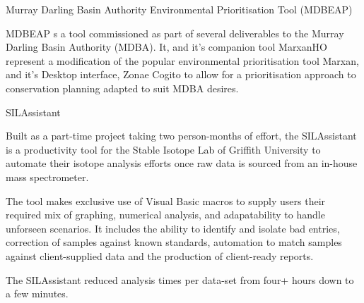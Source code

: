 \documentclass{portfolio}
\begin{document}
\begin{Projects}
\begin{Project}{Murray Darling Basin Authority Environmental Prioritisation Tool (MDBEAP)}
      \begin{ProjectOverview}
        MDBEAP s a tool commissioned as part of several deliverables to the Murray Darling Basin Authority (MDBA).  It, and it's companion tool MarxanHO
        represent a modification of the popular environmental prioritisation tool Marxan, and it's Desktop interface, Zonae Cogito to allow for a 
        prioritisation approach to conservation planning adapted to suit MDBA desires.  
      \end{ProjectOverview}
    \end{Project}
    \begin{Project}{SILAssistant}
      \begin{ProjectOverview}
         Built as a part-time project taking two person-months of effort, the SILAssistant is a productivity tool for the Stable Isotope Lab of 
         Griffith University to automate their isotope analysis efforts once raw data is sourced from an in-house mass spectrometer.  

         The tool makes exclusive use of Visual Basic macros to supply users their required mix of graphing, numerical analysis, and adapatability 
         to handle unforseen scenarios. It includes the ability to identify and isolate bad entries, correction of samples against known 
         standards, automation to match samples against client-supplied data and the production of client-ready reports.


         The SILAssistant reduced analysis times per data-set from four+ hours down to a few minutes. 
      \end{ProjectOverview}
    \end{Project}
  \end{Projects}
  \vfillForced
\end{document}
